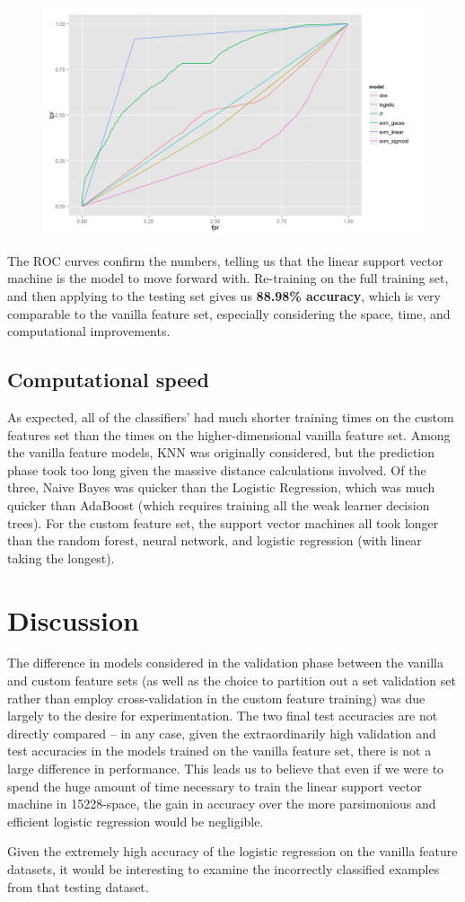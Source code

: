 \documentclass{article} %
\begin{document}
\begin{figure}[h]
\centering
\includegraphics[width=150mm]{roc_custom.png}
\end{figure}
The ROC curves confirm the numbers, telling us that the linear support vector machine is the model to move forward with.  Re-training on the full training set, and then applying to the testing set gives us \textbf{88.98\% accuracy}, which is very comparable to the vanilla feature set, especially considering the space, time, and computational improvements.
\subsection{Computational speed}
As expected, all of the classifiers' had much shorter training times on the custom features set than the times on the higher-dimensional vanilla feature set.  Among the vanilla feature models, KNN was originally considered, but the prediction phase took too long given the massive distance calculations involved.  Of the three, Naive Bayes was quicker than the Logistic Regression, which was much quicker than AdaBoost (which requires training all the weak learner decision trees).  For the custom feature set, the support vector machines all took longer than the random forest, neural network, and logistic regression (with linear taking the longest).
\section{Discussion}
The difference in models considered in the validation phase between the vanilla and custom feature sets (as well as the choice to partition out a set validation set rather than employ cross-validation in the custom feature training) was due largely to the desire for experimentation.  The two final test accuracies are not directly compared -- in any case, given the extraordinarily high validation and test accuracies in the models trained on the vanilla feature set, there is not a large difference in performance.  This leads us to believe that even if we were to spend the huge amount of time necessary to train the linear support vector machine in 15228-space, the gain in accuracy over the more parsimonious and efficient logistic regression would be negligible.\par 
Given the extremely high accuracy of the logistic regression on the vanilla feature datasets, it would be interesting to examine the incorrectly classified examples from that testing dataset.
\end{document}
